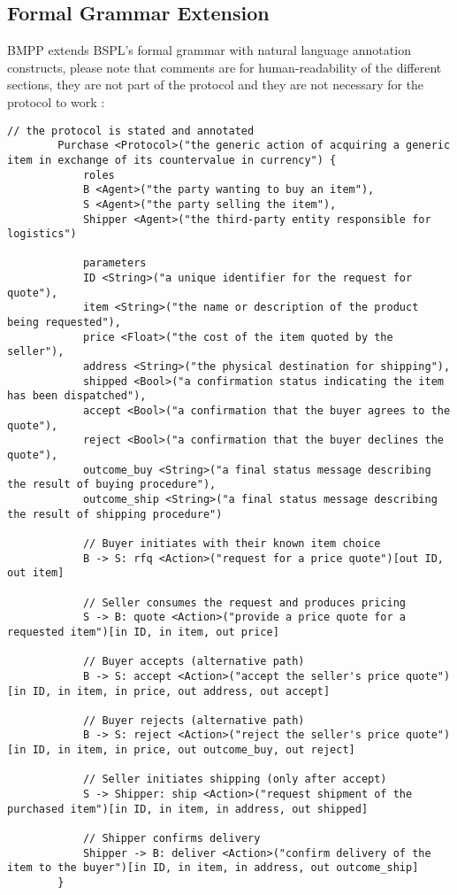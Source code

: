 \documentclass[11pt,a4paper]{article}
\begin{document}
	\subsection{Formal Grammar Extension}
	\label{subsec:grammar}
	
	BMPP extends BSPL's formal grammar with natural language annotation constructs, \textemdash please note that comments are for human-readability of the different sections, they are not part of the protocol and they are not necessary for the protocol to work \textemdash:
	
	\begin{lstlisting}[caption={A more complex example of BMPP complete protocol},label=lst:complex-bmpp]
		// the protocol is stated and annotated
		Purchase <Protocol>("the generic action of acquiring a generic item in exchange of its countervalue in currency") {
			roles
			B <Agent>("the party wanting to buy an item"),
			S <Agent>("the party selling the item"),
			Shipper <Agent>("the third-party entity responsible for logistics")
			
			parameters
			ID <String>("a unique identifier for the request for quote"),
			item <String>("the name or description of the product being requested"),
			price <Float>("the cost of the item quoted by the seller"),
			address <String>("the physical destination for shipping"),
			shipped <Bool>("a confirmation status indicating the item has been dispatched"),
			accept <Bool>("a confirmation that the buyer agrees to the quote"),  
			reject <Bool>("a confirmation that the buyer declines the quote"),
			outcome_buy <String>("a final status message describing the result of buying procedure"),
			outcome_ship <String>("a final status message describing the result of shipping procedure")
			
			// Buyer initiates with their known item choice
			B -> S: rfq <Action>("request for a price quote")[out ID, out item]
			
			// Seller consumes the request and produces pricing
			S -> B: quote <Action>("provide a price quote for a requested item")[in ID, in item, out price]
			
			// Buyer accepts (alternative path)
			B -> S: accept <Action>("accept the seller's price quote")[in ID, in item, in price, out address, out accept]
			
			// Buyer rejects (alternative path)
			B -> S: reject <Action>("reject the seller's price quote")[in ID, in item, in price, out outcome_buy, out reject]
			
			// Seller initiates shipping (only after accept)
			S -> Shipper: ship <Action>("request shipment of the purchased item")[in ID, in item, in address, out shipped]
			
			// Shipper confirms delivery
			Shipper -> B: deliver <Action>("confirm delivery of the item to the buyer")[in ID, in item, in address, out outcome_ship]
		}
	\end{lstlisting}
	
\end{document}
